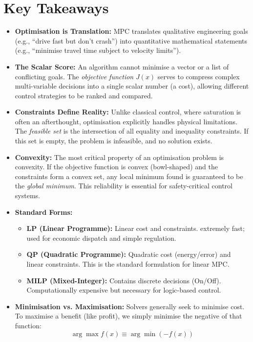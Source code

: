 \section{Key Takeaways}
\begin{itemize}
	\item \textbf{Optimisation is Translation:} MPC translates qualitative engineering goals (e.g., ``drive fast but don't crash'') into quantitative mathematical statements (e.g., ``minimise travel time subject to velocity limits'').
\item \textbf{The Scalar Score:} An algorithm cannot minimise a vector or a list of conflicting goals. The \emph{objective function} $J(x)$ serves to compress complex multi-variable decisions into a single scalar number (a cost), allowing different control strategies to be ranked and compared.

\item \textbf{Constraints Define Reality:} Unlike classical control, where saturation is often an afterthought, optimisation explicitly handles physical limitations. The \emph{feasible set} is the intersection of all equality and inequality constraints. If this set is empty, the problem is infeasible, and no solution exists.

\item \textbf{Convexity:} The most critical property of an optimisation problem is convexity. If the objective function is convex (bowl-shaped) and the constraints form a convex set, any local minimum found is guaranteed to be the \emph{global minimum}. This reliability is essential for safety-critical control systems.

\item \textbf{Standard Forms:}
\begin{itemize}
	\item \textbf{LP (Linear Programme):} Linear cost and constraints. extremely fast; used for economic dispatch and simple regulation.
	\item \textbf{QP (Quadratic Programme):} Quadratic cost (energy/error) and linear constraints. This is the standard formulation for linear MPC.
	\item \textbf{MILP (Mixed-Integer):} Contains discrete decisions (On/Off). Computationally expensive but necessary for logic-based control.
\end{itemize}

\item \textbf{Minimisation vs. Maximisation:} Solvers generally seek to minimise cost. To maximise a benefit (like profit), we simply minimise the negative of that function:
\[ \arg \max f(x) \equiv \arg \min (-f(x)) \]
\end{itemize}

